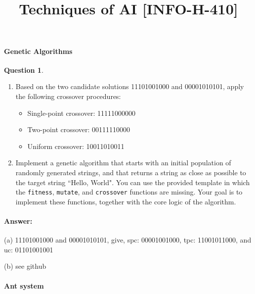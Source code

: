 \documentclass[11pt,a4paper]{article}
\date{\vspace{-1.7cm}\version}
\title{\vspace{-2cm} \tpnumber \\ Techniques of AI [INFO-H-410] \ifthenelse{\boolean{corrige}}{~\\Correction}{}}
\theoremstyle{definition}%
\newtheorem{Q}{Question}[] %
\newcommand{\reponse}[1]{%
\ifthenelse {\boolean{corrige}} {\paragraph{Answer:} \color{darkblue}   #1\color{black}} {}
}
\begin{document}

\maketitle


\paragraph{Genetic Algorithms}

\begin{Q}
\begin{enumerate}
\item Based on the two candidate solutions 11101001000 and 
00001010101, apply the following crossover procedures:
\begin{itemize}
	\item Single-point crossover: 11111000000
	\item Two-point crossover: 	  00111110000
	\item Uniform crossover: 	  10011010011
\end{itemize}
\item Implement a genetic algorithm that starts with an initial
population of randomly generated strings, and that returns a string 
as close as possible to the target string ``Hello, World". 
You can use the provided template in which the \texttt{fitness}, 
\texttt{mutate},  and \texttt{crossover} functions are missing. Your goal is to 
implement these functions, together with the core logic of the 
algorithm.  
\end{enumerate}

\reponse{
    (a) 11101001000 and 00001010101, give, spc: 00001001000, tpc: 11001011000, and uc: 01101001001 

    (b) see github
}

\end{Q}

\paragraph{Ant system}
\end{document}
